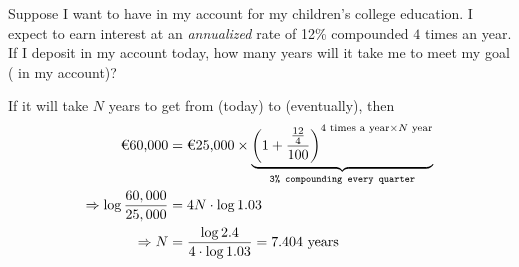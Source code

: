 
%
%
%
%
% 

\question[3]  Suppose I want to have  in my account for my children's college education. 
I expect to earn interest at an \textit{annualized} rate of 12\% compounded $4$ times an year. 
If I deposit  in my account today, how many years will it take me to meet my goal 
(  in my account)?


\ifprintanswers
\fi 

\begin{solution}[\halfpage]
  If it will take $N$ years to get from  (today) to  (eventually), then 
	\begin{align}
    \text{\texteuro{60,000}} &= \text{\texteuro{25,000}}\times
    \underbrace{\left( 1 + \dfrac{\frac{12}{4}}{100} \right)^{4\text{ times a year}\times N\text{ year}}}
    _{\texttt{3\% compounding every quarter}}\\
    \Rightarrow \log \dfrac{60,000}{25,000} &= 4N\cdot\log 1.03 \\
    \Rightarrow N &= \dfrac{\log 2.4}{4\cdot\log 1.03} = 7.404\text{ years}
	\end{align}
\end{solution}
